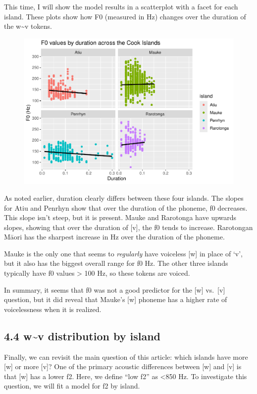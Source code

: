 \documentclass[
  ,man,floatsintext]{apa6}
\begin{document}
This time, I will show the model results in a scatterplot with a facet for each island. These plots show how F0 (measured in Hz) changes over the duration of the w\textasciitilde v tokens.

\begin{figure}
\includegraphics[width=0.75\linewidth]{cim_w_v_manuscript_files/figure-latex/print-modf0-1} \caption{ }\label{fig:print-modf0}
\end{figure}

As noted earlier, duration clearly differs between these four islands. The slopes for Atiu and Penrhyn show that over the duration of the phoneme, f0 decreases. This slope isn't steep, but it is present. Mauke and Rarotonga have upwards slopes, showing that over the duration of {[}v{]}, the f0 tends to increase. Rarotongan Māori has the sharpest increase in Hz over the duration of the phoneme.

Mauke is the only one that seems to \emph{regularly} have voiceless {[}w{]} in place of `v', but it also has the biggest overall range for f0 Hz. The other three islands typically have f0 values \textgreater{} 100 Hz, so these tokens are voiced.

In summary, it seems that f0 was not a good predictor for the {[}w{]} vs.~{[}v{]} question, but it did reveal that Mauke's {[}w{]} phoneme has a higher rate of voicelessness when it is realized.

\subsection{4.4 w\textasciitilde v distribution by island}\label{wv-distribution-by-island}

Finally, we can revisit the main question of this article: which islands have more {[}w{]} or more {[}v{]}? One of the primary acoustic differences between {[}w{]} and {[}v{]} is that {[}w{]} has a lower f2. Here, we define ``low f2'' as \textless850 Hz. To investigate this question, we will fit a model for f2 by island.
\end{document}
